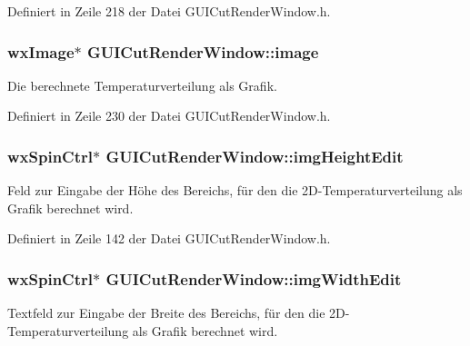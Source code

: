 Definiert in Zeile 218 der Datei G\-U\-I\-Cut\-Render\-Window.\-h.

\hypertarget{classGUICutRenderWindow_a30c36db74a83fc5523407d3611c1db34}{
\subsubsection[{image}]{\setlength{\rightskip}{0pt plus 5cm}wx\-Image$\ast$ G\-U\-I\-Cut\-Render\-Window\-::image\hspace{0.3cm}{\ttfamily [private]}}}\label{classGUICutRenderWindow_a30c36db74a83fc5523407d3611c1db34}
Die berechnete Temperaturverteilung als Grafik. 

Definiert in Zeile 230 der Datei G\-U\-I\-Cut\-Render\-Window.\-h.

\hypertarget{classGUICutRenderWindow_a4daa569840f00756e6781ad2d87aef5b}{
\subsubsection[{img\-Height\-Edit}]{\setlength{\rightskip}{0pt plus 5cm}wx\-Spin\-Ctrl$\ast$ G\-U\-I\-Cut\-Render\-Window\-::img\-Height\-Edit\hspace{0.3cm}{\ttfamily [private]}}}\label{classGUICutRenderWindow_a4daa569840f00756e6781ad2d87aef5b}
Feld zur Eingabe der Höhe des Bereichs, für den die 2\-D-\/\-Temperaturverteilung als Grafik berechnet wird. 

Definiert in Zeile 142 der Datei G\-U\-I\-Cut\-Render\-Window.\-h.

\hypertarget{classGUICutRenderWindow_a211043ba4bd60862a9fbfe1186c40875}{
\subsubsection[{img\-Width\-Edit}]{\setlength{\rightskip}{0pt plus 5cm}wx\-Spin\-Ctrl$\ast$ G\-U\-I\-Cut\-Render\-Window\-::img\-Width\-Edit\hspace{0.3cm}{\ttfamily [private]}}}\label{classGUICutRenderWindow_a211043ba4bd60862a9fbfe1186c40875}
Textfeld zur Eingabe der Breite des Bereichs, für den die 2\-D-\/\-Temperaturverteilung als Grafik berechnet wird. 

